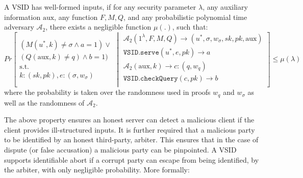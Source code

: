 \begin{definition}\label{deff::VSID-Inputs-Well-formedess}  A  VSID  has  well-formed inputs,   if for any security parameter $\lambda$, any auxiliary information $\text{aux}$, any  function $F, M,Q$, and  any probabilistic polynomial time adversary $\mathcal{A}_{\scriptscriptstyle 2}$, there exists a negligible function $\mu(.)$, such that: 
\small{
$$ Pr\left[
  \begin{array}{l}
  (M(u^{\scriptscriptstyle *},k)\neq \sigma \wedge a=1) \vee\\ (Q(\text{aux},k)\neq q) \wedge  b=1)\\
    \text{s.t. }\\ k:(sk,pk),e:(\sigma,w_{\sigma})
\end{array} \middle |
    \begin{array}{l}
    
    \mathcal{A}_{\scriptscriptstyle 2}(1^{\scriptscriptstyle\lambda},F,M,Q)\rightarrow (u^{\scriptscriptstyle *},\sigma,w_{\sigma},sk,pk,\text{aux})\\
    \mathtt{VSID.serve}(u^{\scriptscriptstyle *},e,pk)\rightarrow a\\
       \mathcal{A}_{\scriptscriptstyle 2}(\text{aux},k)\rightarrow c:(q,w_{q})\\
    \mathtt{VSID.checkQuery}(c, pk)\rightarrow b\\
\end{array}    \right]\leq \mu(\lambda)$$
}
where the probability is taken over the randomness used in  proofs $w_{\scriptscriptstyle q}$ and $w_{\scriptscriptstyle\sigma}$  as well as  the randomness of $\mathcal{A}_{\scriptscriptstyle 2}$.



\end{definition}

The   above property ensures an honest server can detect  a malicious client if the client provides ill-structured inputs. It is further required that a malicious party to be identified by an honest third-party, arbiter. This ensures that in the case of dispute (or false accusation) a malicious party can be pinpointed. A VSID supports  identifiable abort if a corrupt party can escape from being identified, by the arbiter,  with only negligible probability.  More formally:

